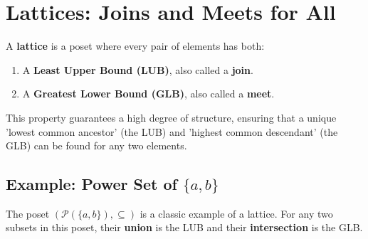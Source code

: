 \documentclass[10pt]{article}
\theoremstyle{definition}
\theoremstyle{plain}
\numberwithin{equation}{section}
\begin{document}
\begin{center}
\end{center}


\section*{Lattices: Joins and Meets for All}

A \textbf{lattice} is a poset where every pair of elements has both:
\begin{enumerate}
  \item A \textbf{Least Upper Bound (LUB)}, also called a \textbf{join}.
  \item A \textbf{Greatest Lower Bound (GLB)}, also called a \textbf{meet}.
\end{enumerate}
This property guarantees a high degree of structure, ensuring that a unique 'lowest common ancestor' (the LUB) and 'highest common descendant' (the GLB) can be found for any two elements.

\subsection*{Example: Power Set of $\{a, b\}$}
The poset $(\mathcal{P}(\{a,b\}), \subseteq)$ is a classic example of a lattice. For any two subsets in this poset, their \textbf{union} is the LUB and their \textbf{intersection} is the GLB.
\end{document}
